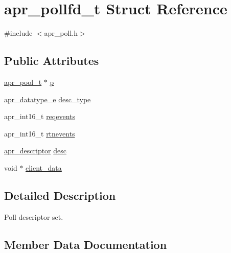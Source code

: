\hypertarget{structapr__pollfd__t}{}\section{apr\+\_\+pollfd\+\_\+t Struct Reference}
\label{structapr__pollfd__t}


{\ttfamily \#include $<$apr\+\_\+poll.\+h$>$}

\subsection*{Public Attributes}
\begin{DoxyCompactItemize}
\item 
\mbox{\hyperlink{group__apr__pools_gaf137f28edcf9a086cd6bc36c20d7cdfb}{apr\+\_\+pool\+\_\+t}} $\ast$ \mbox{\hyperlink{structapr__pollfd__t_adae68586ed671472590efe8770de38cc}{p}}
\item 
\mbox{\hyperlink{group__apr__poll_ga0a8549d84c1721788b102a4cc8b4b0f0}{apr\+\_\+datatype\+\_\+e}} \mbox{\hyperlink{structapr__pollfd__t_acfafd260241a874745f49ba2df246c53}{desc\+\_\+type}}
\item 
apr\+\_\+int16\+\_\+t \mbox{\hyperlink{structapr__pollfd__t_abcedac7097a97823a38ece6e47f4ea9f}{reqevents}}
\item 
apr\+\_\+int16\+\_\+t \mbox{\hyperlink{structapr__pollfd__t_aed5b2109b27984975309922bfa84e3f6}{rtnevents}}
\item 
\mbox{\hyperlink{unionapr__descriptor}{apr\+\_\+descriptor}} \mbox{\hyperlink{structapr__pollfd__t_ad63baa71bb91f80513d33482e28fb967}{desc}}
\item 
void $\ast$ \mbox{\hyperlink{structapr__pollfd__t_a01220e7a71963456461baa40b2a05716}{client\+\_\+data}}
\end{DoxyCompactItemize}


\subsection{Detailed Description}
Poll descriptor set. 

\subsection{Member Data Documentation}
\mbox{\label{structapr__pollfd__t_a01220e7a71963456461baa40b2a05716}} 
